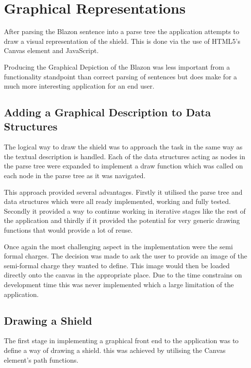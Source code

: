 \chapter{Graphical Representations} 

After parsing the Blazon sentence into a parse tree the application attempts to draw a visual representation of the shield.  This is done via the use of HTML5's Canvas element and JavaScript.  

Producing the Graphical Depiction of the Blazon was less important from a  functionality standpoint than correct parsing of sentences but does make for a much more interesting application for an end user.  


\section{Adding a Graphical Description to Data Structures}
The logical way to draw the shield was to approach the task in the same way as the textual description is handled.  Each of the data structures acting as nodes in the parse tree were expanded to implement a draw function which was called on each node in the parse tree as it was navigated. 


This approach provided several advantages.  Firstly it utilised the parse tree and data structures which were all ready implemented, working and fully tested.  Secondly it provided a way to continue working in iterative stages like the rest of the application and thirdly if it provided the potential for very generic drawing functions that would provide a lot of reuse.


Once again the most challenging aspect in the implementation were the semi formal charges.  The decision was made to ask the user to provide an image of the semi-formal charge they wanted to define.  This image would then be loaded directly onto the canvas in the appropriate place.  Due to the time constrains on development time this was never implemented which a large limitation of the application.




\section{Drawing a Shield}

The first stage in implementing a graphical front end to the application was to define a way of drawing a shield.  this was achieved by utilising the Canvas element's path functions.  


